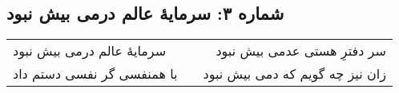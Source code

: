 \begin{center}
\section*{شماره ۳: سرمایۀ عالم درمی بیش نبود}
\label{sec:003}
\begin{longtable}{l p{0.5cm} r}
سرمایهٔ عالم درمی بیش نبود
&&
سر دفترِ هستی عدمی بیش نبود
\\
با همنفسی گر نفسی دستم داد
&&
زان نیز چه گویم که دمی بیش نبود
\\
\end{longtable}
\end{center}
